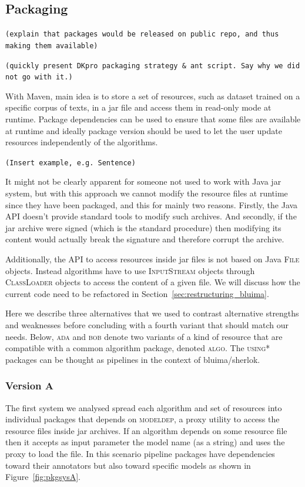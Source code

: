 \documentclass{article}
\newcommand{\ID}[1]{{\textsc{#1}}}
\newcommand{\TODO}[1]{\texttt{\textcolor{YellowOrange}{(#1)}}} %
\begin{document}
\subsection{Packaging}

\TODO{explain that packages would be released on public repo, and thus making them available}

\TODO{quickly present DKpro packaging strategy \& ant script. Say why we did not go with it.}

With Maven, main idea is to store a set of resources, such as dataset trained on a specific corpus of texts, in a jar file and access them in read-only mode at runtime. Package dependencies can be used to ensure that some files are available at runtime and ideally package version should be used to let the user update resources independently of the algorithms.

\TODO{Insert example, e.g. Sentence}

It might not be clearly apparent for someone not used to work with Java jar system, but with this approach we cannot modify the resource files at runtime since they have been packaged, and this for mainly two reasons. Firstly, the Java API doesn't provide standard tools to modify such archives. And secondly, if the jar archive were signed (which is the standard procedure) then modifying its content would actually break the signature and therefore corrupt the archive.

Additionally, the API to access resources inside jar files is not based on Java \ID{File} objects. Instead algorithms have to use \ID{InputStream} objects through \ID{ClassLoader} objects to access the content of a given file. We will discuss how the current code need to be refactored in Section~\ref{sec:restructuring_bluima}.

Here we describe three alternatives that we used to contrast alternative strengths and weaknesses before concluding with a fourth variant that should match our needs. Below, \ID{ada} and \ID{bob} denote two variants of a kind of resource that are compatible with a common algorithm package, denoted \ID{algo}. The \ID{using*} packages can be thought as pipelines in the context of bluima/sherlok.

\subsubsection{Version A}

The first system we analysed spread each algorithm and set of resources into individual packages that depends on \ID{modeldep}, a proxy utility to access the resource files inside jar archives. If an algorithm depends on some resource file then it accepts as input parameter the model name (as a string) and uses the proxy to load the file. In this scenario pipeline packages have dependencies toward their annotators but also toward specific models as shown in Figure~\ref{fig:pkgsysA}.
\end{document}
